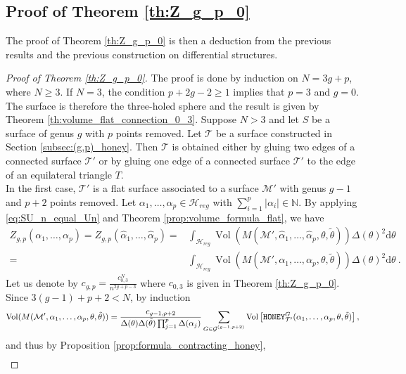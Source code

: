 \documentclass[11pt,a4paper]{amsart}
\providecommand{\diff}{\mathrm d}
\providecommand{\Vol}{\operatorname{Vol}}
\providecommand{\honey}{\texttt{\textsc{HONEY}}}
\numberwithin{equation}{section}
\theoremstyle{definition}
\begin{document}
\subsection{Proof of Theorem \ref{th:Z_g_p_0}}
\label{subsec:proof_th_flat_co}

The proof of Theorem \ref{th:Z_g_p_0} is then a deduction from the previous results and the previous construction on differential structures.

\begin{proof}[Proof of Theorem \ref{th:Z_g_p_0}]
The proof is done by induction on $N=3g+p$, where $N\geqslant 3$. If $N=3$, the condition 
$p + 2g-2 \geqslant 1$ implies that $p=3$ and $g=0$. The surface is therefore the three-holed sphere and 
the result is given by Theorem \ref{th:volume_flat_connection_0_3}. 
Suppose $N>3$ and let $S$ be a surface of genus $g$ with $p$ points removed. 
Let $\mathcal{T}$ be a surface constructed in Section \ref{subsec:(g,p)_honey}. 
Then $\mathcal{T}$ is obtained either by gluing two edges of a connected surface $\mathcal{T}'$ or by gluing one edge of a connected surface 
$\mathcal{T}'$ to the edge of an equilateral triangle $T$. 
\\
In the first case, $\mathcal{T}'$ is a flat surface associated to a surface $\mathcal{M}'$ with genus $g-1$ and $p+2$ points removed. 
Let $\alpha_1,\ldots,\alpha_p\in\mathcal{H}_{reg}$ with $\sum_{i=1}^p\vert\alpha_{i}\vert\in \mathbb{N}$. 
By applying \eqref{eq:SU_n_equal_Un} and Theorem \ref{prop:volume_formula_flat}, we have 
\begin{align*}
Z_{g,p}(\alpha_1,\dots,\alpha_p)=Z_{g,p}(\hat{\alpha}_1,\dots,\hat{\alpha}_p) = 
&\int_{\mathcal{H}_{reg}}\Vol(M(\mathcal{M}',\hat{\alpha}_1,\ldots,\hat{\alpha}_p,\theta,\tilde{\theta}))\Delta(\theta)^2 \diff \theta \\
=&\int_{\mathcal{H}_{reg}}\Vol(M(\mathcal{M}',\alpha_1,\ldots,\alpha_p,\theta,\tilde{\theta}))\Delta(\theta)^2\diff \theta \ .
\end{align*}
Let us denote by $c_{g, p} = \frac{c_{0,3}^{N}}{n^{2g+p-3}}$ where $c_{0, 3}$ is given in Theorem \ref{th:Z_g_p_0}. 
Since $3(g-1)+p+2<N$, by induction
$$\Vol(M(\mathcal{M}',\alpha_1,\ldots,\alpha_p,\theta,\tilde{\theta})) = 
\frac{c_{g-1,p+2}}{\Delta(\theta)\Delta(\tilde{\theta}) \prod_{j=1}^p\Delta(\alpha_j)}\sum_{\substack{G \in \mathcal{G}^{(g-1,p+2)}}}
        \Vol \left[ \honey^G_{\mathcal{T'}}(\alpha_1, 
        \dots, \alpha_p,\theta,\tilde{\theta}) \right],$$
and thus by Proposition \ref{prop:formula_contracting_honey},
\begin{align*}

\end{align*}
\end{proof}
\end{document}
